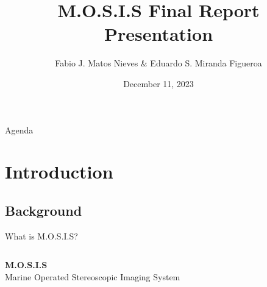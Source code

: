 \documentclass[17pt, aspectratio=169]{beamer}
\title{M.O.S.I.S Final Report Presentation}
\author[Fabio J. \& Eduardo S.]{Fabio J. Matos Nieves \& Eduardo S. Miranda Figueroa}
\institute[UPRM]{University of Puerto Rico Mayagüez Campus}
\date{December 11, 2023}
\begin{document}
\begin{frame}
	\maketitle
\end{frame}
\begin{frame}{Agenda}
	\tableofcontents
\end{frame}
\section{Introduction}
\subsection*{Background}
\begin{frame}{What is M.O.S.I.S?}
	\begin{columns}
		\centering
		\textbf{M.O.S.I.S}\\
		Marine Operated Stereoscopic Imaging System


\end{columns}
\end{frame}
\end{document}
